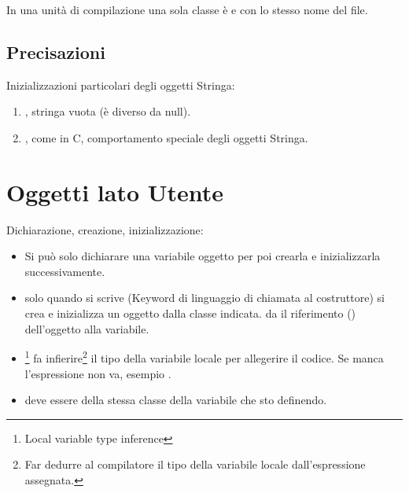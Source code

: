 In una unità di compilazione una sola classe è  e con lo stesso nome del file.

\subsection{Precisazioni}
Inizializzazioni particolari degli oggetti Stringa:
\begin{enumerate}
	\item {}, stringa vuota (è diverso da null).
	\item {}, come in C, comportamento speciale degli oggetti Stringa.
\end{enumerate}

\section{Oggetti lato Utente}
Dichiarazione, creazione, inizializzazione:

\begin{itemize}
	\item {} Si può solo dichiarare una variabile oggetto per poi crearla e inizializzarla successivamente.
	\item solo quando si scrive  (Keyword di linguaggio di chiamata al costruttore) si crea e inizializza un oggetto dalla classe indicata.  da il riferimento () dell'oggetto alla variabile.
	\item {}\footnote{Local variable type inference} fa infierire\footnote{Far dedurre al compilatore il tipo della variabile locale dall'espressione assegnata.} il tipo della variabile locale per allegerire il codice. Se manca l'espressione non va, esempio .
	\item {} deve essere della stessa classe della variabile che sto definendo.
\end{itemize}